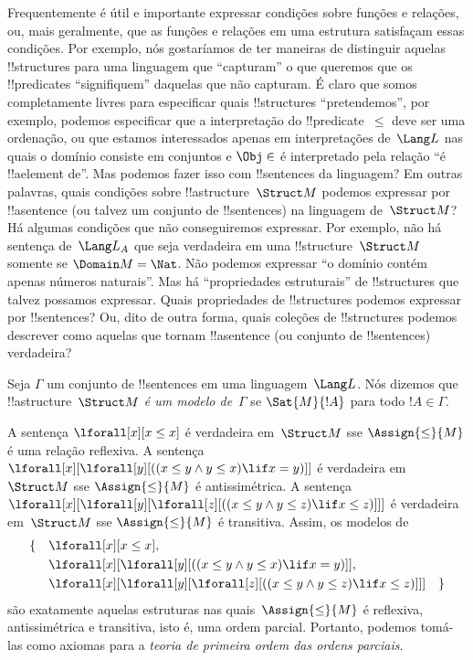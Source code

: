 \documentclass[../../../include/open-logic-section]{subfiles}
\begin{document}


\begin{explain}
Frequentemente é útil e importante expressar condições sobre
funções e relações, ou, mais geralmente, que as funções e
relações em uma estrutura satisfaçam essas condições.  Por exemplo, nós
gostaríamos de ter maneiras de distinguir aquelas !!{structure}s para uma
linguagem que ``capturam'' o que queremos que os !!{predicate}s ``signifiquem''
daquelas que não capturam.  É claro que somos completamente livres para especificar
quais !!{structure}s ``pretendemos'', por exemplo, podemos especificar que a
interpretação do !!{predicate}~$\le$ deve ser uma ordenação, ou que
estamos interessados apenas em interpretações de~$\Lang L$ nas quais o
domínio consiste em conjuntos e $\Obj \in$ é interpretado pela relação ``é
!!a{element} de''.  Mas podemos fazer isso com !!{sentence}s da
linguagem?  Em outras palavras, quais condições sobre
!!a{structure}~$\Struct M$ podemos expressar por !!a{sentence} (ou talvez
um conjunto de !!{sentence}s) na linguagem de~$\Struct M$?  Há
algumas condições que não conseguiremos expressar.  Por exemplo,
não há sentença de~$\Lang L_A$ que seja verdadeira em uma
!!{structure}~$\Struct M$ somente se $\Domain M = \Nat$.  Não podemos expressar
``o domínio contém apenas números naturais''.  Mas há
``propriedades estruturais'' de !!{structure}s que talvez possamos
expressar.  Quais propriedades de !!{structure}s podemos expressar por
!!{sentence}s?  Ou, dito de outra forma, quais coleções de
!!{structure}s podemos descrever como aquelas que tornam !!a{sentence} (ou conjunto
de !!{sentence}s) verdadeira?
\end{explain}

\begin{defn}
Seja $\Gamma$ um conjunto de !!{sentence}s em uma linguagem~$\Lang L$.  Nós
dizemos que !!a{structure}~$\Struct M$ \emph{é um modelo de}~$\Gamma$ se
$\Sat{M}{!A}$ para todo $!A \in \Gamma$.
\end{defn}

\begin{ex}
A sentença $\lforall[x][x \le x]$ é verdadeira em~$\Struct M$ sse
$\Assign{\le}{M}$ é uma relação reflexiva.  A sentença
$\lforall[x][\lforall[y][((x \le y \land y \le x) \lif x = y)]]$ é
verdadeira em~$\Struct M$ sse $\Assign{\le}{M}$ é antissimétrica.  A
sentença $\lforall[x][\lforall[y][\lforall[z][((x \le y \land y \le z)
      \lif x \le z)]]]$ é verdadeira em~$\Struct M$ sse $\Assign{\le}{M}$
é transitiva.  Assim, os modelos de
\begin{align*}
\{\quad &\lforall[x][x \le x], \\
   & \lforall[x][\lforall[y][((x \le y \land y \le
    x) \lif x = y)]], \\
   &\lforall[x][\lforall[y][\lforall[z][((x \le y
      \land y \le z) \lif x \le z)]]] \quad \}
\end{align*}
são exatamente aquelas estruturas nas quais~$\Assign{\le}{M}$ é reflexiva,
antissimétrica e transitiva, isto é, uma ordem parcial.  Portanto, podemos tomá-las
como axiomas para a \emph{teoria de primeira ordem das ordens parciais}.
\end{ex}
\end{document}
